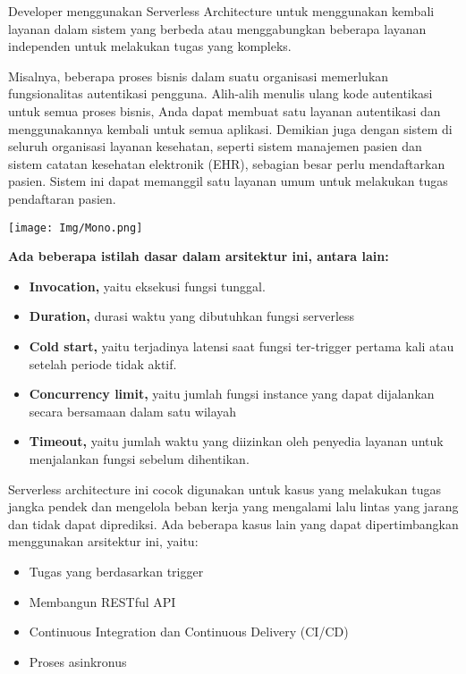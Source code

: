 \documentclass[a4paper,12pt]{article}
\begin{document}
Developer menggunakan Serverless Architecture untuk menggunakan kembali layanan dalam sistem yang berbeda atau menggabungkan beberapa layanan independen untuk melakukan tugas yang kompleks. 

Misalnya, beberapa proses bisnis dalam suatu organisasi memerlukan fungsionalitas autentikasi pengguna. Alih-alih menulis ulang kode autentikasi untuk semua proses bisnis, Anda dapat membuat satu layanan autentikasi dan menggunakannya kembali untuk semua aplikasi. Demikian juga dengan sistem di seluruh organisasi layanan kesehatan, seperti sistem manajemen pasien dan sistem catatan kesehatan elektronik (EHR), sebagian besar perlu mendaftarkan pasien. Sistem ini dapat memanggil satu layanan umum untuk melakukan tugas pendaftaran pasien.

\texttt{[image: Img/Mono.png]}

\textbf{Ada beberapa istilah dasar dalam arsitektur ini, antara lain:}

\begin{itemize}
	\item \textbf{Invocation,} yaitu eksekusi fungsi tunggal.
	\item \textbf{Duration,} durasi waktu yang dibutuhkan fungsi serverless
	\item \textbf{Cold start,} yaitu terjadinya latensi saat fungsi ter-trigger pertama kali atau setelah periode tidak aktif.
	\item \textbf{Concurrency limit,} yaitu jumlah fungsi instance yang dapat dijalankan secara bersamaan dalam satu wilayah
	\item \textbf{Timeout,} yaitu jumlah waktu yang diizinkan oleh penyedia layanan untuk menjalankan fungsi sebelum dihentikan.
\end{itemize}

Serverless architecture ini cocok digunakan untuk kasus yang melakukan tugas jangka pendek dan mengelola beban kerja yang mengalami lalu lintas yang jarang dan tidak dapat diprediksi. Ada beberapa kasus lain yang dapat dipertimbangkan menggunakan arsitektur ini, yaitu:

\begin{itemize}
	\item Tugas yang berdasarkan trigger
	\item Membangun RESTful API
	\item Continuous Integration dan Continuous Delivery (CI/CD)
	\item Proses asinkronus
\end{itemize}
\end{document}
